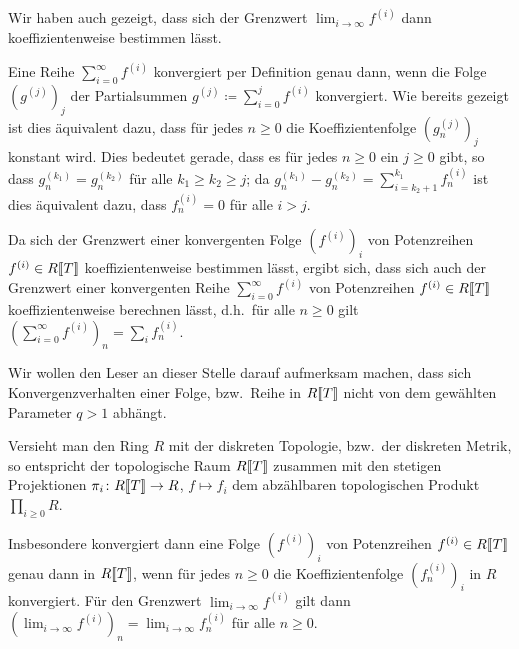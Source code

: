 \documentclass[a4paper, 10pt, numbers=noenddot]{scrartcl}
\begin{document}
Wir haben auch gezeigt, dass sich der Grenzwert $\lim_{i \to \infty} f^{(i)}$ dann koeffizientenweise bestimmen lässt.

Eine Reihe $\sum_{i = 0}^\infty f^{(i)}$ konvergiert per Definition genau dann, wenn die Folge $(g^{(j)})_j$ der Partialsummen $g^{(j)} \coloneqq \sum_{i=0}^j f^{(i)}$ konvergiert.
Wie bereits gezeigt ist dies äquivalent dazu, dass für jedes $n \geq 0$ die Koeffizientenfolge $(g^{(j)}_n)_j$ konstant wird.
Dies bedeutet gerade, dass es für jedes $n \geq 0$ ein $j \geq 0$ gibt, so dass $g^{(k_1)}_n = g^{(k_2)}_n$ für alle $k_1 \geq k_2 \geq j$;
da $g^{(k_1)}_n - g^{(k_2)}_n = \sum_{i = k_2 + 1}^{k_1} f^{(i)}_n$ ist dies äquivalent dazu, dass $f^{(i)}_n = 0$ für alle $i > j$.

Da sich der Grenzwert einer konvergenten Folge $(f^{(i)})_i$ von Potenzreihen $f^{(i)} \in R[\![T]\!]$ koeffizientenweise bestimmen lässt, ergibt sich, dass sich auch der Grenzwert einer konvergenten Reihe $\sum_{i=0}^\infty f^{(i)}$ von Potenzreihen $f^{(i)} \in R[\![T]\!]$ koeffizientenweise berechnen lässt, d.h.\ für alle $n \geq 0$ gilt $(\sum_{i=0}^\infty f^{(i)})_n = \sum_i f^{(i)}_n$.

Wir wollen den Leser an dieser Stelle darauf aufmerksam machen, dass sich Konvergenzverhalten einer Folge, bzw.\ Reihe in $R[\![T]\!]$ nicht von dem gewählten Parameter $q > 1$ abhängt.

\begin{remark}
  \label{remark: product topology on ring of power series}
  Versieht man den Ring $R$ mit der diskreten Topologie, bzw.\ der diskreten Metrik, so entspricht der topologische Raum $R[\![T]\!]$ zusammen mit den stetigen Projektionen $\pi_i \colon R[\![T]\!] \to R$, $f \mapsto f_i$ dem abzählbaren topologischen Produkt $\prod_{i \geq 0} R$.
  
  Insbesondere konvergiert dann eine Folge $(f^{(i)})_i$ von Potenzreihen $f^{(i)} \in R[\![T]\!]$ genau dann in $R[\![T]\!]$, wenn für jedes $n \geq 0$ die Koeffizientenfolge $(f^{(i)}_n)_i$ in $R$ konvergiert.
  Für den Grenzwert $\lim_{i \to \infty} f^{(i)}$ gilt dann $(\lim_{i \to \infty} f^{(i)})_n = \lim_{i \to \infty} f^{(i)}_n$ für alle $n \geq 0$.
\end{remark}
\end{document}
